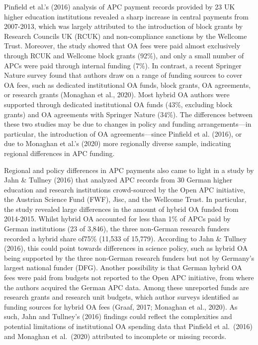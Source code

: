 \documentclass[a4paper,man,floatsintext,longtable,noextraspace,12pt]{apa6}
\begin{document}
Pinfield et al.'s (2016) analysis of APC payment records provided by 23
UK higher education institutions revealed a sharp increase in central
payments from 2007-2013, which was largely attributed to the
introduction of block grants by Research Councils UK (RCUK) and
non-compliance sanctions by the Wellcome Trust. Moreover, the study
showed that OA fees were paid almost exclusively through RCUK and
Wellcome block grants (92\%), and only a small number of APCs were paid
through internal funding (7\%). In contrast, a recent Springer Nature
survey found that authors draw on a range of funding sources to cover OA
fees, such as dedicated institutional OA funds, block grants, OA
agreements, or research grants (Monaghan et al., 2020). Most hybrid OA
authors were supported through dedicated institutional OA funds (43\%,
excluding block grants) and OA agreements with Springer Nature (34\%).
The differences between these two studies may be due to changes in
policy and funding arrangements---in particular, the introduction of OA
agreements---since Pinfield et al. (2016), or due to Monaghan et al.'s
(2020) more regionally diverse sample, indicating regional differences
in APC funding.

Regional and policy differences in APC payments also came to light in a
study by Jahn \& Tullney (2016) that analyzed APC records from 30 German
higher education and research institutions crowd-sourced by the Open APC
initiative, the Austrian Science Fund (FWF), Jisc, and the Wellcome
Trust. In particular, the study revealed large differences in the amount
of hybrid OA funded from 2014-2015. Whilst hybrid OA accounted for less
than 1\% of APCs paid by German institutions (23 of 3,846), the three
non-German research funders recorded a hybrid share of75\% (11,533 of
15,779). According to Jahn \& Tullney (2016), this could point towards
differences in science policy, such as hybrid OA being supported by the
three non-German research funders but not by Germany's largest national
funder (DFG). Another possibility is that German hybrid OA fees were
paid from budgets not reported to the Open APC initiative, from where
the authors acquired the German APC data. Among these unreported funds
are research grants and research unit budgets, which author surveys
identified as funding sources for hybrid OA fees (Graaf, 2017; Monaghan
et al., 2020). As such, Jahn and Tullney's (2016) findings could reflect
the complexities and potential limitations of institutional OA spending
data that Pinfield et al.~(2016) and Monaghan et al.~(2020) attributed
to incomplete or missing records.
\end{document}
